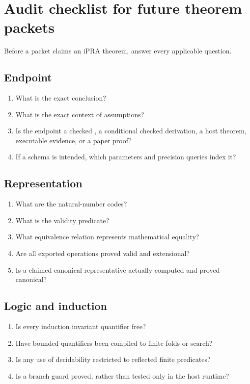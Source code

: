 
\section{Audit checklist for future theorem packets}
\label{app:checklist}

Before a packet claims an iPRA theorem, answer every applicable question.

\subsection*{Endpoint}

\begin{enumerate}
\item What is the exact  conclusion?
\item What is the exact context of assumptions?
\item Is the endpoint a checked , a conditional checked
derivation, a host theorem, executable evidence, or a paper proof?
\item If a schema is intended, which parameters and precision queries index it?
\end{enumerate}

\subsection*{Representation}

\begin{enumerate}
\item What are the natural-number codes?
\item What is the validity predicate?
\item What equivalence relation represents mathematical equality?
\item Are all exported operations proved valid and extensional?
\item Is a claimed canonical representative actually computed and proved
canonical?
\end{enumerate}

\subsection*{Logic and induction}

\begin{enumerate}
\item Is every induction invariant quantifier free?
\item Have bounded quantifiers been compiled to finite folds or search?
\item Is any use of decidability restricted to reflected finite predicates?
\item Is a branch guard proved, rather than tested only in the host runtime?
\end{enumerate}

